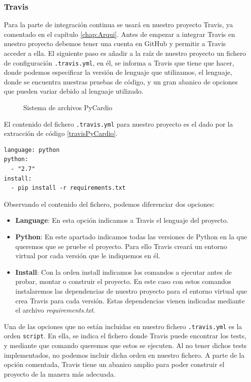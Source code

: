 \subsubsection*{Travis}
\label{subsubsec:Travis}
Para la parte de integración continua se usará en nuestro proyecto Travis, ya comentado en el capítulo \ref{chap:Arqui}. Antes de empezar a integrar Travis en nuestro proyecto debemos tener una cuenta en GitHub y permitir a Travis acceder a ella. El siguiente paso es añadir a la raíz de nuestro proyecto un fichero de configuración \texttt{.travis.yml}, en él, se informa a Travis que tiene que hacer, donde podemos especificar la versión de lenguaje que utilizamos, el lenguaje, donde se encuentra nuestras pruebas de código, y un gran abanico de opciones que pueden variar debido al lenguaje utilizado. \\

\begin{figure}[h]
\centering
{}
\caption{Sistema de archivos PyCardio}
\label{fig:travisDir}
\end{figure}
El contenido del fichero \texttt{.travis.yml} para nuestro proyecto es el dado por la extracción de código \ref{travisPyCardio}. 
\begin{lstlisting}[caption={\texttt{.travis.yml} de PyCardio},label=travisPyCardio]
language: python
python:
  - "2.7"
install:
  - pip install -r requirements.txt
\end{lstlisting}
Observando el contenido del fichero, podemos diferenciar dos opciones:
\begin{itemize}
    \item \textbf{Language}: En esta opción indicamos a Travis el lenguaje del proyecto.
    \item \textbf{Python}: En este apartado indicamos todas las versiones de Python en la que queremos que se pruebe el proyecto. Para ello Travis creará un entorno virtual por cada versión que le indiquemos en él.
    \item \textbf{Install}: Con la orden install indicamos los comandos a ejecutar antes de probar, montar o construir el proyecto. En este caso con estos comandos instalaremos las dependencias de nuestro proyecto para el entorno virtual que crea Travis para cada versión. Estas dependencias vienen indicadas mediante el archivo \textit{requirements.txt}. 
\end{itemize}
Una de las opciones que no están incluidas en nuestro fichero \texttt{.travis.yml} es la orden \texttt{script}. En ella, se indica el fichero donde Travis puede encontrar los tests, y mediante que comando queremos que estos se ejecuten. Al no tener dichos tests implementados, no podemos incluir dicha orden en nuestro fichero. A parte de la opción comentada, Travis tiene un abanico amplio para poder construir el proyecto de la manera más adecuada.

